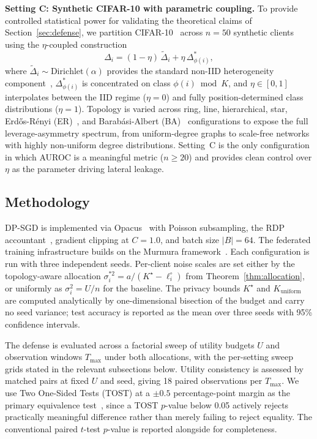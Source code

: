 \documentclass[letterpaper,journal]{IEEEtran}
\begin{document}
\noindent\textbf{Setting C: Synthetic CIFAR-10 with parametric
coupling.} To provide controlled statistical power for validating
the theoretical claims of Section~\ref{sec:defense}, we partition
CIFAR-10~\cite{krizhevsky2009cifar} across $n = 50$ synthetic
clients using the $\eta$-coupled construction
\[
\Delta_i = (1-\eta)\,\tilde{\Delta}_i + \eta\,\Delta^*_{\phi(i)},
\]
where $\tilde{\Delta}_i \sim \mathrm{Dirichlet}(\alpha)$ provides
the standard non-IID heterogeneity
component~\cite{hsu2019dirichlet}, $\Delta^*_{\phi(i)}$ is
concentrated on class $\phi(i) \bmod K$, and $\eta \in [0,1]$
interpolates between the IID regime ($\eta = 0$) and fully
position-determined class distributions ($\eta = 1$). Topology is
varied across ring, line, hierarchical, star, Erd\H{o}s-R\'{e}nyi
(ER)~\cite{erdos1959random}, and Barab\'{a}si-Albert
(BA)~\cite{barabasi1999emergence} configurations to expose the full
leverage-asymmetry spectrum, from uniform-degree graphs to
scale-free networks with highly non-uniform degree distributions.
Setting~C is the only configuration in which AUROC is a meaningful
metric ($n \geq 20$) and provides clean control over $\eta$ as the
parameter driving lateral leakage.

\subsection{Methodology}
\label{sec:experiments-methodology}

DP-SGD is implemented via Opacus~\cite{yousefpour2021opacus} with
Poisson subsampling, the RDP accountant~\cite{mironov2017rdp},
gradient clipping at $C = 1.0$, and batch size $|B| = 64$. The
federated training infrastructure builds on the Murmura
framework~\cite{rangwala2026murmura}. Each configuration is run
with three independent seeds. Per-client noise scales are set either
by the topology-aware allocation $\sigma_i^{*2} = a / (K^\star -
\ell_i^\circ)$ from Theorem~\ref{thm:allocation}, or uniformly as
$\sigma_i^2 = U/n$ for the baseline. The privacy bounds $K^\star$
and $K_{\mathrm{uniform}}$ are computed analytically by
one-dimensional bisection of the budget and carry no seed variance;
test accuracy is reported as the mean over three seeds with 95\%
confidence intervals.

The defense is evaluated across a factorial sweep of utility budgets
$U$ and observation windows $T_{\max}$ under both allocations, with
the per-setting sweep grids stated in the relevant subsections below.
Utility consistency is assessed by matched pairs at fixed $U$ and
seed, giving 18 paired observations per $T_{\max}$. We use Two
One-Sided Tests (TOST) at a $\pm 0.5$ percentage-point margin as
the primary equivalence test~\cite{lakens2017equivalence}, since a
TOST $p$-value below 0.05 actively rejects practically meaningful
difference rather than merely failing to reject equality. The
conventional paired $t$-test $p$-value is reported alongside for
completeness.
\end{document}
